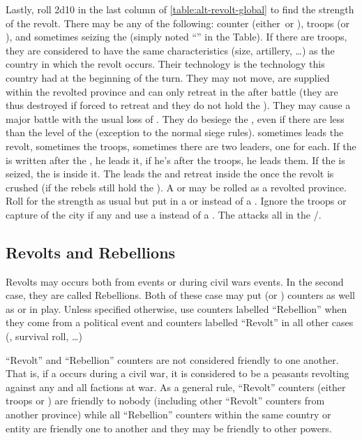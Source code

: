 \aparag Lastly, roll 2d10 in the last column of
\ref{table:alt-revolt-global} to find the strength of the revolt.
\bparag There may be any of the following: \REVOLT counter (either\
\facemoins or \Faceplus), troops (\LD or \ARMY\facemoins), \LeaderG and
sometimes seizing the \fortress (simply noted ``\fortress'' in the
Table).
\bparag If there are troops, they are considered to have the same
characteristics (size, artillery, \ldots) as the country in which the
revolt occurs. Their technology is the technology this country had at
the beginning of the turn. They may not move, are supplied within the
revolted province and can only retreat in the \fortress after battle
(they are thus destroyed if forced to retreat and they do not hold the
\fortress). They may cause a major battle with the usual loss of
\STAB. They do besiege the \fortress, even if there are less \LD than
the level of the \fortress (exception to the normal siege rules).
\bparag \LeaderG sometimes leads the revolt, sometimes the troops,
sometimes there are two leaders, one for each. If the \LeaderG is
written after the \REVOLT, he leads it, if he's after the troops, he
leads them.
\bparag If the \fortress is seized, the \LD is inside it. The \LeaderG
leads the \REVOLT and retreat inside the \fortress once the revolt is
crushed (if the rebels still hold the \fortress).
\bparag A \CTZ or \STZ may be rolled as a revolted province. Roll for
the strength as usual but put in a \PIRATE\facemoins or \PIRATE\faceplus
instead of a \REVOLT. Ignore the troops or capture of the city if any
and use a \LeaderA instead of a \LeaderG. The \PIRATE attacks all
\TradeFLEET in the \CTZ/\STZ.

\subsection{Revolts and Rebellions}
\aparag Revolts may occurs both from \RD events or during civil wars
events. In the second case, they are called Rebellions.
\bparag Both of these case may put \REVOLT (or \REBELLION) counters as
well as \ARMY or \LD in play.
\bparag Unless specified otherwise, use counters labelled ``Rebellion''
when they come from a political event and counters labelled ``Revolt''
in all other cases (\RD, \TUR survival roll, \ldots)

\aparag ``Revolt'' and ``Rebellion'' counters are not considered
friendly to one another. That is, if a \RD occurs during a civil war, it
is considered to be a peasants revolting against any and all factions at
war.
\bparag As a general rule, ``Revolt'' counters (either troops or
\REVOLT) are friendly to nobody (including other ``Revolt'' counters
from another province) while all ``Rebellion'' counters within the same
country or entity are friendly one to another and they may be friendly
to other powers.

